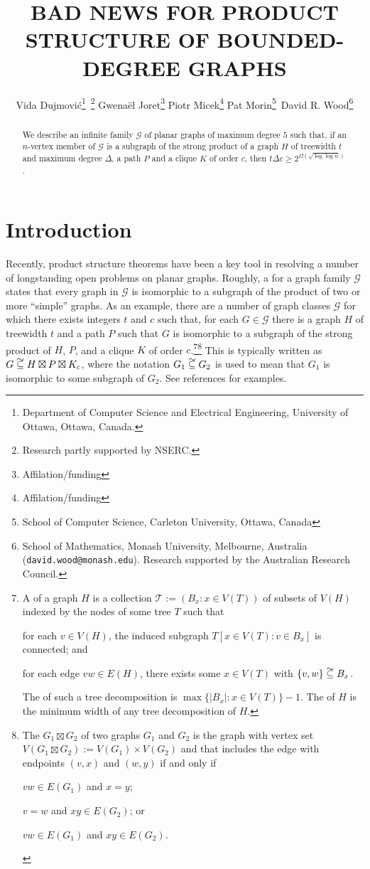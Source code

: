 \documentclass{patmorin}
\title{\MakeUppercase{Bad News for Product Structure of Bounded-Degree Graphs}}
\author{%
  Vida Dujmović\thanks{Department of Computer Science and Electrical Engineering, University of Ottawa, Ottawa, Canada.}\, \thanks{Research partly supported by NSERC.} \quad
  Gwenaël Joret\thanks{Affilation/funding} \quad
  Piotr Micek\thanks{Affilation/funding}\quad
  Pat Morin\thanks{School of Computer Science, Carleton University, Ottawa, Canada}\, \footnotemark[2] \quad
  David R. Wood\thanks{School of Mathematics, Monash University, Melbourne, Australia (\texttt{david.wood@monash.edu}). Research supported by the Australian Research Council.}
}
\date{}
\newcommand\subsetcong{\mathrel{\text{%
    \setbox0\hbox{$\subseteq$}%
    \rlap{\hbox to \wd0{\hss\hss\hss\raisebox{1.5\height}{$\sim$}\hss}}\box0
}}}
\renewcommand{\ge}{\geqslant}
\begin{document}
\maketitle


\begin{abstract}
  We describe an infinite family $\mathcal{G}$ of planar graphs of maximum degree $5$ such that, if an $n$-vertex member of $\mathcal{G}$ is a subgraph of the strong product of a graph $H$ of treewidth $t$ and maximum degree $\Delta$, a path $P$ and a clique $K$ of order $c$, then $t\Delta c \ge 2^{\Omega(\sqrt{\log\log n})}$.
\end{abstract}

\section{Introduction}

Recently, product structure theorems have been a key tool in resolving a number of longstanding open problems on planar graphs.  Roughly, a  for a graph family $\mathcal{G}$ states that every graph in $\mathcal{G}$ is isomorphic to a subgraph of the product of two or more ``simple'' graphs.  As an example, there are a number of graph classes $\mathcal{G}$ for which there exists integers $t$ and $c$ such that, for each $G\in\mathcal{G}$ there is a graph $H$ of treewidth $t$ and a path $P$ such that $G$ is isomorphic to a subgraph of the strong product of $H$, $P$, and a clique $K$ of order $c$.\footnote{A  of a graph $H$ is a collection $\mathcal{T}:=(B_x:x\in V(T))$ of subsets of $V(H)$ indexed by the nodes of some tree $T$ such that
\begin{inparaenum}[(i)]
  \item for each $v\in V(H)$, the induced subgraph $T[x\in V(T):v\in B_x]$ is connected; and
  \item for each edge $vw\in E(H)$, there exists some $x\in V(T)$ with $\{v,w\}\subsetcong B_x$.
\end{inparaenum}
The  of such a tree decomposition is $\max\{|B_x|:x\in V(T)\}-1$. The  of $H$ is the minimum width of any tree decomposition of $H$.}\footnote{The  $G_1\boxtimes G_2$ of two graphs $G_1$ and $G_2$ is the graph with vertex set $V(G_1\boxtimes G_2):=V(G_1)\times V(G_2)$ and that includes the edge with endpoints $(v,x)$ and $(w,y)$ if and only if
\begin{inparaenum}[(i)]
  \item $vw\in E(G_1)$ and $x=y$;
  \item $v=w$ and $xy\in E(G_2)$; or
  \item $vw\in E(G_1)$ and $xy\in E(G_2)$.
\end{inparaenum}
}
This is typically written as $G\subsetcong H\boxtimes P\boxtimes K_c$, where the notation $G_1\subsetcong G_2$ is used to mean that $G_1$ is isomorphic to some subgraph of $G_2$.  See references \cite{dujmovic.joret.ea:planar,dujmovic.morin.ea:structure,krauthgamer.lee:intrinsic,ueckerdt.wood.ea:improved,bose.morin.ea:optimal,campbell.clinch.ea:product,illingworth.scott.ea:alon} for examples.
\end{document}
